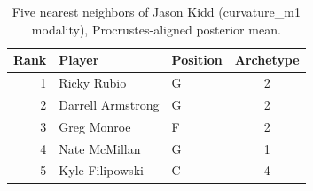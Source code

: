 \begin{table}[htbp]
  \centering\small
  \begin{tabular}{rllc}
    \toprule
    Rank & Player & Position & Archetype \\
    \midrule
    1 & Ricky Rubio & G & 2 \\
    2 & Darrell Armstrong & G & 2 \\
    3 & Greg Monroe & F & 2 \\
    4 & Nate McMillan & G & 1 \\
    5 & Kyle Filipowski & C & 4 \\
    \bottomrule
  \end{tabular}
  \caption{Five nearest neighbors of Jason Kidd (curvature_m1 modality), Procrustes-aligned posterior mean.}
  \label{tab:Jason_Kidd_neighbors_curvature_m1}
\end{table}

